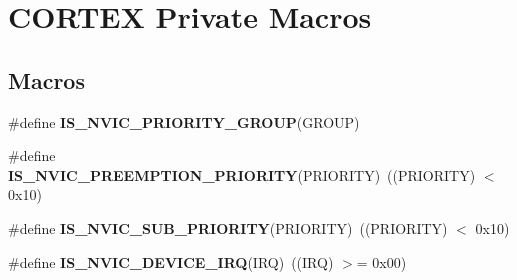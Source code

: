 \hypertarget{group___c_o_r_t_e_x___private___macros}{}\section{C\+O\+R\+T\+EX Private Macros}
\label{group___c_o_r_t_e_x___private___macros}
\subsection*{Macros}
\begin{DoxyCompactItemize}
\item 
\#define {\bfseries I\+S\+\_\+\+N\+V\+I\+C\+\_\+\+P\+R\+I\+O\+R\+I\+T\+Y\+\_\+\+G\+R\+O\+UP}(G\+R\+O\+UP)
\item 
\#define {\bfseries I\+S\+\_\+\+N\+V\+I\+C\+\_\+\+P\+R\+E\+E\+M\+P\+T\+I\+O\+N\+\_\+\+P\+R\+I\+O\+R\+I\+TY}(P\+R\+I\+O\+R\+I\+TY)~((P\+R\+I\+O\+R\+I\+TY) $<$ 0x10)\hypertarget{group___c_o_r_t_e_x___private___macros_gaf30fd8f5960c2e28a772d8f16bb156dd}{}\label{group___c_o_r_t_e_x___private___macros_gaf30fd8f5960c2e28a772d8f16bb156dd}

\item 
\#define {\bfseries I\+S\+\_\+\+N\+V\+I\+C\+\_\+\+S\+U\+B\+\_\+\+P\+R\+I\+O\+R\+I\+TY}(P\+R\+I\+O\+R\+I\+TY)~((P\+R\+I\+O\+R\+I\+TY) $<$ 0x10)\hypertarget{group___c_o_r_t_e_x___private___macros_ga010705bc997dcff935b965b372cba61d}{}\label{group___c_o_r_t_e_x___private___macros_ga010705bc997dcff935b965b372cba61d}

\item 
\#define {\bfseries I\+S\+\_\+\+N\+V\+I\+C\+\_\+\+D\+E\+V\+I\+C\+E\+\_\+\+I\+RQ}(I\+RQ)~((I\+RQ) $>$= 0x00)\hypertarget{group___c_o_r_t_e_x___private___macros_ga9b8dcac4ed8e88c14d9bb04e369dad6a}{}\label{group___c_o_r_t_e_x___private___macros_ga9b8dcac4ed8e88c14d9bb04e369dad6a}


\end{DoxyCompactItemize}
